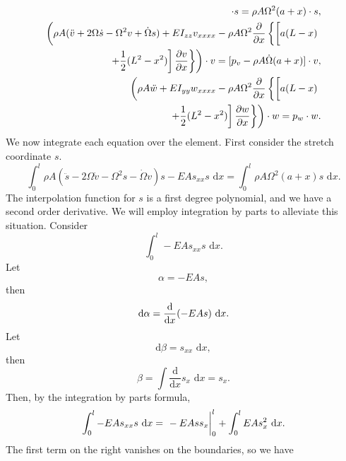 \begin{eqnarray}
[\rho A(\ddot s - 2\Omega\dot v-\Omega^2s-\dot\Omega v)-EAs_{xx}]\cdot s = \rho A\Omega^2(a+x)\cdot s, \\
\left(\rho A(\ddot v + 2\Omega\dot s-\Omega^2v+\dot\Omega s)+EI_{zz}v_{xxxx}-\rho A\Omega^2\frac{\partial}{\partial x}\left\lbrace \left[a(L-x)\vphantom{\frac{1}{2}}\right.\right.\right.\\
\left.\left.\left.+\frac{1}{2}(L^2-x^2)\right]\frac{\partial v}{\partial x}\right\rbrace\right)\cdot v = [p_v - \rho A\dot\Omega(a+x)]\cdot v, \nonumber \\
\left(\rho A\ddot w+EI_{yy}w_{xxxx}-\rho A\Omega^2\frac{\partial}{\partial x}\left\lbrace \left[a(L-x)\vphantom{\frac{1}{2}}\right.\right.\right.\\
\left.\left.\left.+\frac{1}{2}(L^2-x^2)\right]\frac{\partial w}{\partial x}\right\rbrace\right)\cdot w = p_w\cdot w. \nonumber
\end{eqnarray}
We now integrate each equation over the element. First consider the stretch coordinate $s$.
\begin{equation}
\int_0^l \rho A(\ddot s-2\Omega\dot v-\Omega^2s-\dot\Omega v)s-EAs_{xx}s \text{ d}x = \int_0^l \rho A\Omega^2(a+x)s\text{ d}x.
\end{equation}
The interpolation function for $s$ is a first degree polynomial, and we have a second order derivative. We will employ integration by parts to alleviate this situation.
Consider
\begin{equation}
\int_0^l -EAs_{xx}s\text{ d}x. 
\end{equation}
Let
\begin{equation}
\alpha = -EAs,
\end{equation}
then
\begin{equation}
\text d\alpha = \frac{\text d}{\text dx}(-EAs)\text{ d}x.
\end{equation}
Let
\begin{equation}
\text{d}\beta = s_{xx}\text{ d}x,
\end{equation}
then
\begin{equation}
\beta = \int \frac{\text{d}}{\text{d}x}s_x\text{ d}x = s_x.
\end{equation}
Then, by the integration by parts formula,
\begin{equation}
\int_0^l -EAs_{xx}s\text{ d}x = \left.\vphantom{\int}-EAss_x\right|_0^l+\int_0^l EAs_x^2\text{ d}x.
\label{eq:s.disc.int.by.parts}
\end{equation}
The first term on the right vanishes on the boundaries, so we have
